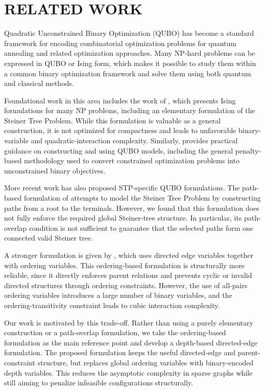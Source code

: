 \documentclass[a4paper,12pt]{report}
\begin{document}
\chapter{RELATED WORK}

Quadratic Unconstrained Binary Optimization (QUBO) has become a standard framework for encoding combinatorial optimization problems for quantum annealing and related optimization approaches. Many NP-hard problems can be expressed in QUBO or Ising form, which makes it possible to study them within a common binary optimization framework and solve them using both quantum and classical methods.

Foundational work in this area includes the work of \cite{Lucas_2014}, which presents Ising formulations for many NP problems, including an elementary formulation of the Steiner Tree Problem. While this formulation is valuable as a general construction, it is not optimized for compactness and leads to unfavorable binary-variable and quadratic-interaction complexity. Similarly, \cite{glover2019tutorialformulatingusingqubo} provides practical guidance on constructing and using QUBO models, including the general penalty-based methodology used to convert constrained optimization problems into unconstrained binary objectives.

More recent work has also proposed STP-specific QUBO formulations. The path-based formulation of \cite{li2026steinertreeproblemnovel} attempts to model the Steiner Tree Problem by constructing paths from a root to the terminals. However, we found that this formulation does not fully enforce the required global Steiner-tree structure. In particular, its path-overlap condition is not sufficient to guarantee that the selected paths form one connected valid Steiner tree.

A stronger formulation is given by \cite{alex_2017}, which uses directed edge variables together with ordering variables. This ordering-based formulation is structurally more reliable, since it directly enforces parent relations and prevents cyclic or invalid directed structures through ordering constraints. However, the use of all-pairs ordering variables introduces a large number of binary variables, and the ordering-transitivity constraint leads to cubic interaction complexity.

Our work is motivated by this trade-off. Rather than using a purely elementary construction or a path-overlap formulation, we take the ordering-based formulation as the main reference point and develop a depth-based directed-edge formulation. The proposed formulation keeps the useful directed-edge and parent-constraint structure, but replaces global ordering variables with binary-encoded depth variables. This reduces the asymptotic complexity in sparse graphs while still aiming to penalize infeasible configurations structurally.
\end{document}
